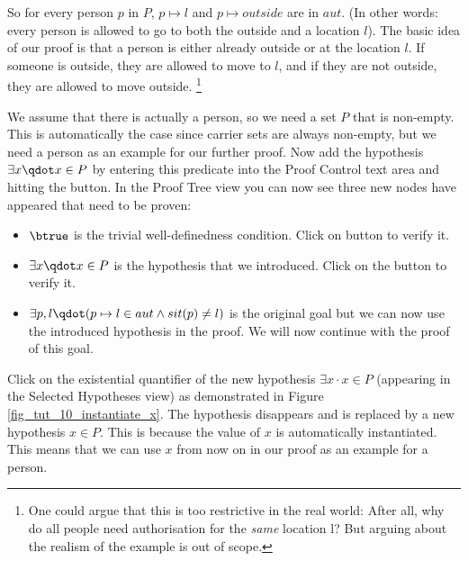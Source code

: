 So for every person $p$ in $P$, $p \mapsto l$ and $p \mapsto outside$ are in $aut$.
(In other words: every person is allowed to go to both the outside and a location $l$).
The basic idea of our proof is that a person is either already outside or at the location $l$. If someone is outside, they are allowed to move to $l$, and if they are not outside, they are allowed to move outside. \footnote{One could argue that this is too restrictive in the real world: After all, why do all people need authorisation for the \textit{same} location l?  But arguing about the realism of the example is out of scope.}

We assume that there is actually a person, so we need a set $P$ that is non-empty.
This is automatically the case since carrier sets are always non-empty, but we need a person as an example for our further proof.
Now add the hypothesis $\exists x \qdot x \in P$ by entering this predicate into the \textsf{Proof Control} text area and hitting the  button.
In the \textsf{Proof Tree} view you can now see three new nodes have appeared that need to be proven:
\begin{itemize}
\item $\btrue$ is the trivial well-definedness condition. Click on  button to verify it.
\item $\exists x\qdot x\in P$ is the hypothesis that we introduced. Click on the  button to verify it.
\item $\exists p, l\qdot (p \mapsto  l \in  aut \land  sit(p) \neq  l)$ is the original goal
  but we can now use the introduced hypothesis in the proof. We will now continue with the proof of this goal.
\end{itemize}

Click on the existential quantifier of the new hypothesis $\exists x \cdot x \in P$
  (appearing in the \textsf{Selected Hypotheses} view) as demonstrated in Figure \ref{fig_tut_10_instantiate_x}.
The hypothesis disappears and is replaced by a new hypothesis $x \in P$. This is because the value of $x$ is automatically instantiated. This means that we can use $x$ from now on in our proof as an example for a person.


